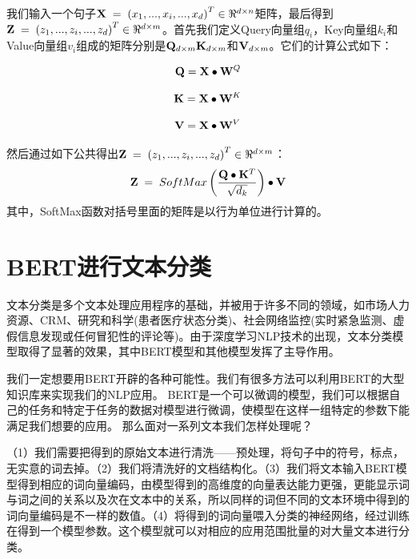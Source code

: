 \documentclass[]{article}
\begin{document}
我们输入一个句子$ {\bf{X}}\; = \;{\left( {{x_1},...,{x_i},...,{x_d}} \right)^T} \in {\Re ^{d \times n}} $矩阵，最后得到$ {\bf{Z}}\; = \;{\left( {{z_1},...,{z_i},...,{z_d}} \right)^T} \in {\Re ^{d \times m}} $。首先我们定义Query向量组$ q_i $，Key向量组$ k_i $和Value向量组$ v_i $组成的矩阵分别是$ {{\bf{Q}}_{d \times m}}{{\bf{K}}_{d \times m}}$和${{\bf{V}}_{d \times m}} $。它们的计算公式如下：

\begin{equation}
	{\bf{Q}}\;{\rm{ = }}\;{\bf{X}} \bullet {{\bf{W}}^Q}
\end{equation}

\begin{equation}
	{\bf{K}}\;{\rm{ = }}\;{\bf{X}} \bullet {{\bf{W}}^K}
\end{equation}

\begin{equation}
	{\bf{V}}\;{\rm{ = }}\;{\bf{X}} \bullet {{\bf{W}}^V}
\end{equation}

然后通过如下公共得出$ {\bf{Z}}\; = \;{\left( {{z_1},...,{z_i},...,{z_d}} \right)^T} \in {\Re ^{d \times m}} $：
\begin{equation}
	{\bf{Z}}\; = \;SoftMax\left( {\frac{{{\bf{Q}} \bullet {{\bf{K}}^T}}}{{\sqrt {{d_k}} }}} \right) \bullet {\bf{V}}
\end{equation}
其中，SoftMax函数对括号里面的矩阵是以行为单位进行计算的。


\section{BERT进行文本分类}
文本分类是多个文本处理应用程序的基础，并被用于许多不同的领域，如市场人力资源、CRM、研究和科学(患者医疗状态分类)、社会网络监控(实时紧急监测、虚假信息发现或任何冒犯性的评论等)。由于深度学习NLP技术的出现，文本分类模型取得了显著的效果，其中BERT模型和其他模型发挥了主导作用。

我们一定想要用BERT开辟的各种可能性。我们有很多方法可以利用BERT的大型知识库来实现我们的NLP应用。
BERT是一个可以微调的模型，我们可以根据自己的任务和特定于任务的数据对模型进行微调，使模型在这样一组特定的参数下能满足我们想要的应用。
那么面对一系列文本我们怎样处理呢？

（1）我们需要把得到的原始文本进行清洗——预处理，将句子中的符号，标点，无实意的词去掉。（2）我们将清洗好的文档结构化。（3）我们将文本输入BERT模型得到相应的词向量编码，由模型得到的高维度的向量表达能力更强，更能显示词与词之间的关系以及次在文本中的关系，所以同样的词但不同的文本环境中得到的词向量编码是不一样的数值。（4）将得到的词向量喂入分类的神经网络，经过训练在得到一个模型参数。这个模型就可以对相应的应用范围批量的对大量文本进行分类。
\end{document}
